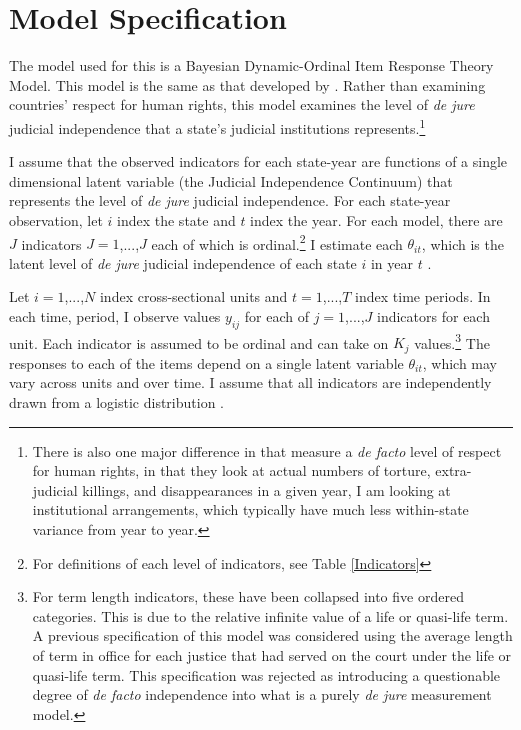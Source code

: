 \documentclass[12pt]{article}
\begin{document}
\section{Model Specification}\label{ModelApp}
The model used for this is a Bayesian Dynamic-Ordinal Item Response Theory Model.  This model is the same as that developed by \citet{Schnakenberg2014}.  Rather than examining countries' respect for human rights, this model examines the level of \textit{de jure} judicial independence that a state's judicial institutions represents.\footnote{There is also one major difference in that \citeauthor{Schnakenberg2014} measure a \textit{de facto} level of respect for human rights, in that they look at actual numbers of torture, extra-judicial killings, and disappearances in a given year, I am looking at institutional arrangements, which typically have much less within-state variance from year to year.}	

I assume that the observed indicators for each state-year are functions of a single dimensional latent variable (the Judicial Independence Continuum) that represents the level of \textit{de jure} judicial independence.  For each state-year observation, let $i$ index the state and $t$ index the year.  For each model, there are $J$ indicators $J=1$,...,$J$ each of which is ordinal.\footnote{For definitions of each level of indicators, see Table \ref{Indicators}} I estimate each $\theta_{it}$, which is the latent level of \textit{de jure} judicial independence of each state $i$ in year $t$ \citep[7]{Schnakenberg2014}.

Let $i=1$,...,$N$ index cross-sectional units and $t=1$,...,$T$ index time periods.  In each time, period, I observe values $y_{ij}$ for each of $j=1$,...,$J$ indicators for each unit.  Each indicator is assumed to be ordinal and can take on $K_j$ values.\footnote{For term length indicators, these have been collapsed into five ordered categories.  This is due to the relative infinite value of a life or quasi-life term.  A previous specification of this model was considered using the average length of term in office for each justice that had served on the court under the life or quasi-life term.  This specification was rejected as introducing a questionable degree of \textit{de facto} independence into what is a purely \textit{de jure} measurement model.}  The responses to each of the items depend on a single latent variable $\theta_{it}$, which may vary across units and over time. I assume that all indicators are independently drawn from a logistic distribution \citep[7]{Schnakenberg2014}. 
\end{document}
